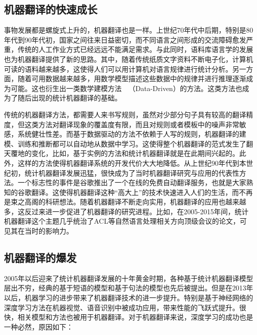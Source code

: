 
\subsection{机器翻译的快速成长}

\parinterval 事物发展都是螺旋式上升的，机器翻译也是一样。上世纪70年代中后期，特别是80年代到90年代初，国家之间往来日益密切，而不同语言之间形成的交流障碍愈发严重，传统的人工作业方式已经远远不能满足需求。与此同时，语料库语言学的发展也为机器翻译提供了新的思路。其中，随着传统纸质文字资料不断电子化，计算机可读的语料越来越多，这使得人们可以用计算机对语言规律进行统计分析。另一方面，随着可用数据越来越多，用数学模型描述这些数据中的规律并进行推理逐渐成为可能。这也衍生出一类数学建模方法\ \dash\ {\small{}}（Data-Driven）的方法。这类方法也成为了随后出现的统计机器翻译的基础。

传统的机器翻译方法，都需要人来书写规则，虽然对少部分句子具有较高的翻译精度，但这类方法对翻译现象的覆盖度有限，而且对规则或者模板中的噪声非常敏感，系统健壮性差。而基于数据驱动的方法不依赖于人写的规则，机器翻译的建模、训练和推断都可以自动地从数据中学习。这使得整个机器翻译的范式发生了翻天覆地的变化，比如，基于实例的方法和统计机器翻译就是在此期间兴起的。此外，这样的方法使得机器翻译系统的开发代价大大地降低。从上世纪90年代到本世纪初，统计机器翻译发展迅猛，很快成为了当时机器翻译研究与应用的代表性方法。一个标志性的事件是谷歌推出了一个在线的免费自动翻译服务，也就是大家熟知的谷歌翻译。这使得机器翻译这种``高大上''的技术快速进入人们的生活，而不再是束之高阁的科研想法。随着机器翻译不断走向实用，机器翻译的应用也越来越多，这反过来进一步促进了机器翻译的研究进程。比如，在2005-2015年间，统计机器翻译这个主题几乎统治了ACL等自然语言处理相关方向顶级会议的论文，可见其在当时的影响力。


\subsection{机器翻译的爆发}

\parinterval 2005年以后迎来了统计机器翻译发展的十年黄金时期，各种基于统计机器翻译模型层出不穷，经典的基于短语的模型和基于句法的模型也先后被提出。但是在2013年以后，机器学习的进步带来了机器翻译技术的进一步提升。特别是基于神经网络的深度学习方法在机器视觉、语音识别中被成功应用，带来性能的飞跃式提升。很快，相关模型和方法也被用于机器翻译。对于机器翻译来说，深度学习的成功也是一种必然，原因如下：

